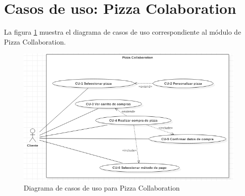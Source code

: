 
\pagebreak
\section{Casos de uso: Pizza Colaboration}

	La figura \ref{CUs:PizzaCollaboration} muestra el diagrama de casos de uso correspondiente al módulo de Pizza Collaboration.

	\begin{figure}[h]

		\begin{center}

			\includegraphics[scale=0.60]{imagenes/CUs/RegistroSolicitantes/CUs-PizzaCollaboration.png}
			\caption{Diagrama de casos de uso para Pizza Collaboration }
			\label{CUs:PizzaCollaboration}

		\end{center}
		
	\end{figure}